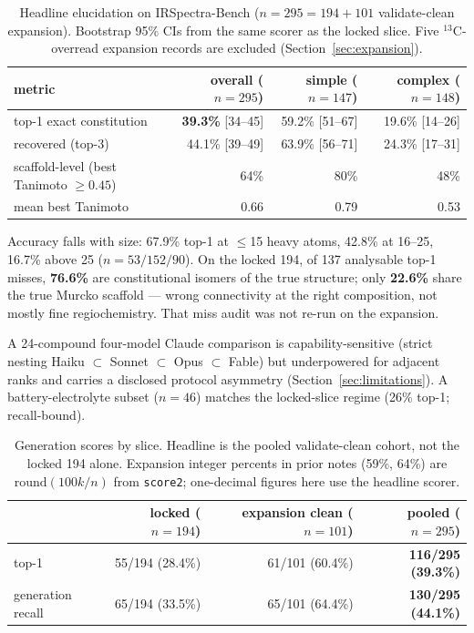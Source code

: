 \documentclass{article}
\begin{document}
\begin{table}[t]
\caption{Headline elucidation on IRSpectra-Bench ($n{=}295{=}194{+}101$ validate-clean
expansion). Bootstrap 95\% CIs from the same scorer as the locked slice. Five $^{13}$C-overread
expansion records are excluded (Section~\ref{sec:expansion}).}
\label{tab:headline}
\centering
\small
\setlength{\tabcolsep}{4pt}
\begin{tabular}{@{}lrrr@{}}
\toprule
metric & overall ($n{=}295$) & simple ($n{=}147$) & complex ($n{=}148$) \\
\midrule
top-1 exact constitution & \textbf{39.3\%} [34--45] & 59.2\% [51--67] & 19.6\% [14--26] \\
recovered (top-3) & 44.1\% [39--49] & 63.9\% [56--71] & 24.3\% [17--31] \\
scaffold-level (best Tanimoto $\geq 0.45$) & 64\% & 80\% & 48\% \\
mean best Tanimoto & 0.66 & 0.79 & 0.53 \\
\bottomrule
\end{tabular}
\end{table}

Accuracy falls with size: 67.9\% top-1 at $\leq$15 heavy atoms, 42.8\% at 16--25, 16.7\% above 25
($n{=}53/152/90$).
On the locked 194, of 137 analysable top-1 misses, \textbf{76.6\%} are constitutional isomers of the true
structure; only \textbf{22.6\%} share the true Murcko scaffold --- wrong connectivity at the
right composition, not mostly fine regiochemistry. That miss audit was not re-run on the expansion.

A 24-compound four-model Claude comparison is capability-sensitive (strict nesting Haiku
$\subset$ Sonnet $\subset$ Opus $\subset$ Fable) but underpowered for adjacent ranks and carries
a disclosed protocol asymmetry (Section~\ref{sec:limitations}).
A battery-electrolyte subset ($n{=}46$) matches the locked-slice regime (26\% top-1; recall-bound).

\begin{table}[t]
\caption{Generation scores by slice. Headline is the pooled validate-clean cohort, not the
locked 194 alone. Expansion integer percents in prior notes (59\%, 64\%) are $\mathrm{round}(100k/n)$
from \texttt{score2}; one-decimal figures here use the headline scorer.}
\label{tab:slices}
\centering
\small
\begin{tabular}{@{}lrrr@{}}
\toprule
 & locked ($n{=}194$) & expansion clean ($n{=}101$) & pooled ($n{=}295$) \\
\midrule
top-1 & 55/194 (28.4\%) & 61/101 (60.4\%) & \textbf{116/295 (39.3\%)} \\
generation recall & 65/194 (33.5\%) & 65/101 (64.4\%) & \textbf{130/295 (44.1\%)} \\
\bottomrule
\end{tabular}
\end{table}
\end{document}
